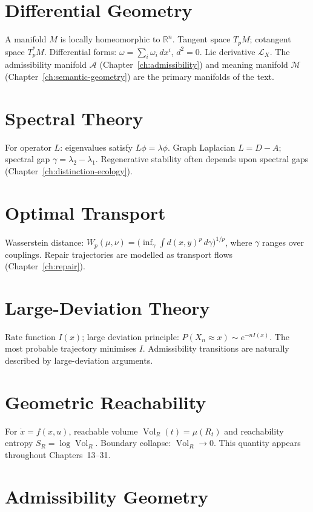 \documentclass[12pt,twoside,openright]{book}
\newcommand{\adm}{\mathcal{A}}
\newcommand{\Vol}{\operatorname{Vol}}
\begin{document}
\section{Differential Geometry}

A manifold $M$ is locally homeomorphic to $\mathbb{R}^n$.
Tangent space $T_p M$; cotangent space $T_p^* M$.
Differential forms: $\omega = \sum_i \omega_i\,dx^i$,
$d^2 = 0$.
Lie derivative $\mathcal{L}_X$.
The admissibility manifold $\adm$ (Chapter~\ref{ch:admissibility})
and meaning manifold $\mathcal{M}$
(Chapter~\ref{ch:semantic-geometry}) are the primary
manifolds of the text.

\section{Spectral Theory}

For operator $L$: eigenvalues satisfy $L\phi = \lambda\phi$.
Graph Laplacian $L = D - A$; spectral gap
$\gamma = \lambda_2 - \lambda_1$.
Regenerative stability often depends upon spectral gaps
(Chapter~\ref{ch:distinction-ecology}).

\section{Optimal Transport}

Wasserstein distance:
$W_p(\mu,\nu) = \bigl(\inf_\gamma \int d(x,y)^p\,
d\gamma\bigr)^{1/p}$, where $\gamma$ ranges over
couplings. Repair trajectories are modelled as transport
flows (Chapter~\ref{ch:repair}).

\section{Large-Deviation Theory}

Rate function $I(x)$; large deviation principle:
$P(X_n \approx x) \sim e^{-nI(x)}$.
The most probable trajectory minimises $I$.
Admissibility transitions are naturally described by
large-deviation arguments.

\section{Geometric Reachability}

For $\dot{x} = f(x,u)$, reachable volume
$\Vol_R(t) = \mu(R_t)$ and reachability entropy
$S_R = \log\Vol_R$.
Boundary collapse: $\Vol_R \to 0$.
This quantity appears throughout Chapters~13--31.

\section{Admissibility Geometry}
\end{document}
